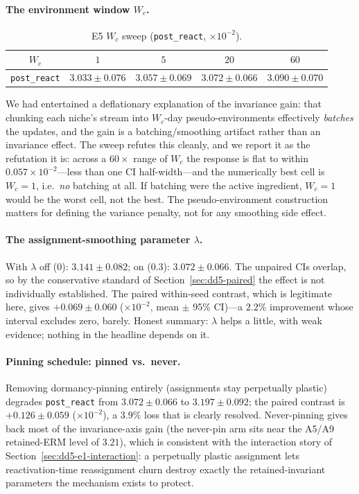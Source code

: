 \paragraph{The environment window $W_c$.}

\begin{table}[h]
\centering
\caption{E5 $W_c$ sweep (\texttt{post\_react}, $\times 10^{-2}$).}
\label{tab:dd5-e5-wc}
\small
\begin{tabular}{ccccc}
\toprule
$W_c$ & $1$ & $5$ & $20$ & $60$ \\
\midrule
\texttt{post\_react} & $3.033 \pm 0.076$ & $3.057 \pm 0.069$ &
$3.072 \pm 0.066$ & $3.090 \pm 0.070$ \\
\bottomrule
\end{tabular}
\end{table}

We had entertained a deflationary explanation of the invariance gain: that
chunking each niche's stream into $W_c$-day pseudo-environments effectively
\emph{batches} the updates, and the gain is a batching/smoothing artifact
rather than an invariance effect. The sweep refutes this cleanly, and we
report it as the refutation it is: across a $60\times$ range of $W_c$ the
response is flat to within $0.057 \times 10^{-2}$---less than one CI
half-width---and the numerically best cell is $W_c = 1$, i.e.\ \emph{no}
batching at all. If batching were the active ingredient, $W_c = 1$ would be
the worst cell, not the best. The pseudo-environment construction matters
for defining the variance penalty, not for any smoothing side effect.

\paragraph{The assignment-smoothing parameter $\lambda$.}
With $\lambda$ off ($0$): $3.141 \pm 0.082$; on ($0.3$): $3.072 \pm 0.066$.
The unpaired CIs overlap, so by the conservative standard of
Section~\ref{sec:dd5-paired} the effect is not individually established.
The paired within-seed contrast, which is legitimate here, gives
$+0.069 \pm 0.060$ ($\times 10^{-2}$, mean $\pm$ 95\% CI)---a $2.2\%$
improvement whose interval excludes zero, barely. Honest summary:
$\lambda$ helps a little, with weak evidence; nothing in the headline
depends on it.

\paragraph{Pinning schedule: pinned vs.\ never.}
Removing dormancy-pinning entirely (assignments stay perpetually plastic)
degrades \texttt{post\_react} from $3.072 \pm 0.066$ to $3.197 \pm 0.092$;
the paired contrast is $+0.126 \pm 0.059$ ($\times 10^{-2}$), a $3.9\%$
loss that is clearly resolved. Never-pinning gives back most of the
invariance-axis gain (the never-pin arm sits near the A5/A9 retained-ERM
level of $3.21$), which is consistent with the interaction story of
Section~\ref{sec:dd5-e1-interaction}: a perpetually plastic assignment lets
reactivation-time reassignment churn destroy exactly the retained-invariant
parameters the mechanism exists to protect.


